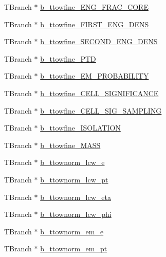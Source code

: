 \begin{DoxyCompactItemize}
T\+Branch $\ast$ \hyperlink{classCollectionTree_ada7753e356b77b61ab0eef7610478def}{b\+\_\+ttowfine\+\_\+\+E\+N\+G\+\_\+\+F\+R\+A\+C\+\_\+\+C\+O\+RE}
\item 
T\+Branch $\ast$ \hyperlink{classCollectionTree_ad91547ecdcc26ffc314e750c2d1851d9}{b\+\_\+ttowfine\+\_\+\+F\+I\+R\+S\+T\+\_\+\+E\+N\+G\+\_\+\+D\+E\+NS}
\item 
T\+Branch $\ast$ \hyperlink{classCollectionTree_aa5f7578d05a6f10d19adaa7499d0f0a7}{b\+\_\+ttowfine\+\_\+\+S\+E\+C\+O\+N\+D\+\_\+\+E\+N\+G\+\_\+\+D\+E\+NS}
\item 
T\+Branch $\ast$ \hyperlink{classCollectionTree_a8bd63074adb711c66018446e9d5ffcf7}{b\+\_\+ttowfine\+\_\+\+P\+TD}
\item 
T\+Branch $\ast$ \hyperlink{classCollectionTree_a4243ee1f13fd0afeb692d1ab53907d2f}{b\+\_\+ttowfine\+\_\+\+E\+M\+\_\+\+P\+R\+O\+B\+A\+B\+I\+L\+I\+TY}
\item 
T\+Branch $\ast$ \hyperlink{classCollectionTree_aac73cc1782d9ada7081018d7e732aef9}{b\+\_\+ttowfine\+\_\+\+C\+E\+L\+L\+\_\+\+S\+I\+G\+N\+I\+F\+I\+C\+A\+N\+CE}
\item 
T\+Branch $\ast$ \hyperlink{classCollectionTree_affc3c2f6e61e405ab3498f25ee38d491}{b\+\_\+ttowfine\+\_\+\+C\+E\+L\+L\+\_\+\+S\+I\+G\+\_\+\+S\+A\+M\+P\+L\+I\+NG}
\item 
T\+Branch $\ast$ \hyperlink{classCollectionTree_a6382393f96dd0aadcf3e188b7c2fefde}{b\+\_\+ttowfine\+\_\+\+I\+S\+O\+L\+A\+T\+I\+ON}
\item 
T\+Branch $\ast$ \hyperlink{classCollectionTree_aad63d2a15ccf34299e0f94c2cde74322}{b\+\_\+ttowfine\+\_\+\+M\+A\+SS}
\item 
T\+Branch $\ast$ \hyperlink{classCollectionTree_a75c011948ba9f2600d1796711a0927d3}{b\+\_\+ttownorm\+\_\+lcw\+\_\+e}
\item 
T\+Branch $\ast$ \hyperlink{classCollectionTree_a8f4fe235575610b981e3e617a4405f0f}{b\+\_\+ttownorm\+\_\+lcw\+\_\+pt}
\item 
T\+Branch $\ast$ \hyperlink{classCollectionTree_a988af76199171c207bfc9750f21b542a}{b\+\_\+ttownorm\+\_\+lcw\+\_\+eta}
\item 
T\+Branch $\ast$ \hyperlink{classCollectionTree_abd4b8c0d4a6d83e5c298b75933ef69b7}{b\+\_\+ttownorm\+\_\+lcw\+\_\+phi}
\item 
T\+Branch $\ast$ \hyperlink{classCollectionTree_ac68851453c4fbab7f962357ccaef004f}{b\+\_\+ttownorm\+\_\+em\+\_\+e}
\item 
T\+Branch $\ast$ \hyperlink{classCollectionTree_aaaa3618e725ab24a54d761bdc00e9fe3}{b\+\_\+ttownorm\+\_\+em\+\_\+pt}

\end{DoxyCompactItemize}
